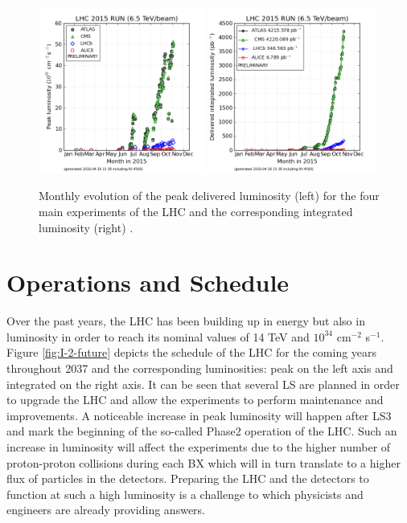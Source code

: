		\begin{figure}[h!]
			\centering
			\includegraphics[width=0.49\textwidth]{img/I-2-LHC/luminosity-peak.png}
			\includegraphics[width=0.49\textwidth]{img/I-2-LHC/luminosity-integrated.png}
			\caption{Monthly evolution of the peak delivered luminosity (left) for the four main experiments of the LHC and the corresponding integrated luminosity (right) \cite{LUMI-PP-LPC}.}
			\label{fig:I-2-luminosity}
		\end{figure}

	\section{Operations and Schedule}

    Over the past years, the LHC has been building up in energy but also in luminosity in order to reach its nominal values of 14 TeV and $ 10^{34} $ cm$^{-2}$ s$^{-1}$. Figure \ref{fig:I-2-future} depicts the schedule of the LHC for the coming years throughout 2037 and the corresponding luminosities: peak on the left axis and integrated on the right axis. It can be seen that several LS are planned in order to upgrade the LHC and allow the experiments to perform maintenance and improvements. A noticeable increase in peak luminosity will happen after LS3 and mark the beginning of the so-called Phase2 operation of the LHC. Such an increase in luminosity will affect the experiments due to the higher number of proton-proton collisions during each BX which will in turn translate to a higher flux of particles in the detectors. Preparing the LHC and the detectors to function at such a high luminosity is a challenge to which physicists and engineers are already providing answers.

